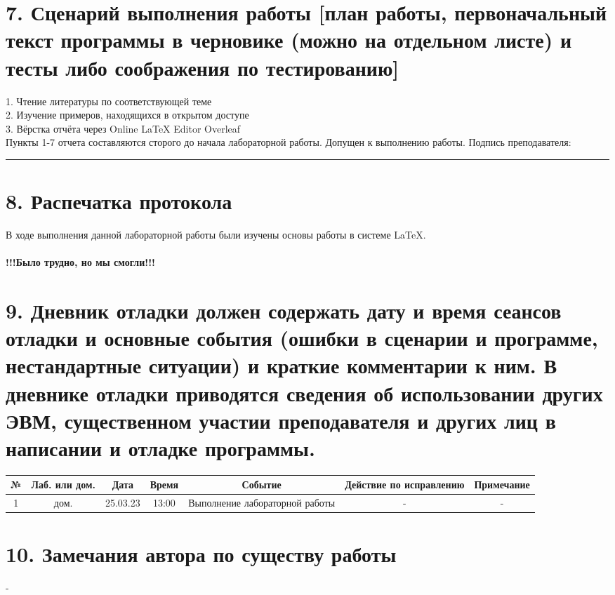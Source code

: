 \documentclass[a4paper]{report} %
\begin{document}
\section*{7. Сценарий выполнения работы [план работы, первоначальный текст программы в черновике (можно на отдельном листе) и тесты либо соображения по тестированию]}

1. Чтение литературы по соответствующей теме  \\
2. Изучение примеров, находящихся в открытом доступе \\
3. Вёрстка отчёта через Online LaTeX Editor Overleaf\\

Пункты 1-7 отчета составляются сторого до начала лабораторной работы. Допущен к выполнению работы.
Подпись преподавателя: \rule{60}{0.03}

\thispagestyle{empty}

\section*{8. Распечатка протокола}

В ходе выполнения данной лабораторной работы были изучены основы работы в системе LaTeX.

\paragraph{
!!!Было трудно, но мы смогли!!!}

\section*{9. Дневник отладки должен содержать дату и время сеансов отладки и основные события (ошибки в сценарии и программе, нестандартные ситуации) и краткие комментарии к ним. В дневнике отладки приводятся сведения об использовании других ЭВМ, существенном участии преподавателя и других лиц в написании и отладке программы.}

\begin{tabular}{ | c | c | c | c | c | c | c | }
\hline
№ & Лаб. или дом. & Дата & Время & Событие & Действие по исправлению & Примечание \\
\hline
1 & дом. & 25.03.23 & 13:00 & Выполнение лабораторной работы & - & - \\
\hline
\end{tabular}

\section*{10. Замечания автора по существу работы}
-
\end{document}
